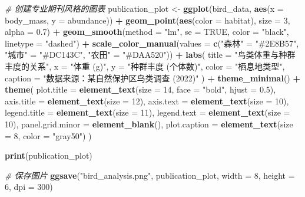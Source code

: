 \documentclass[
  twoside]{book}
\newenvironment{Shaded}{\begin{snugshade}}{\end{snugshade}}
\newcommand{\AttributeTok}[1]{\textcolor[rgb]{0.13,0.29,0.53}{#1}}
\newcommand{\CommentTok}[1]{\textcolor[rgb]{0.56,0.35,0.01}{\textit{#1}}}
\newcommand{\ConstantTok}[1]{\textcolor[rgb]{0.56,0.35,0.01}{#1}}
\newcommand{\DecValTok}[1]{\textcolor[rgb]{0.00,0.00,0.81}{#1}}
\newcommand{\FloatTok}[1]{\textcolor[rgb]{0.00,0.00,0.81}{#1}}
\newcommand{\FunctionTok}[1]{\textcolor[rgb]{0.13,0.29,0.53}{\textbf{#1}}}
\newcommand{\NormalTok}[1]{#1}
\newcommand{\OtherTok}[1]{\textcolor[rgb]{0.56,0.35,0.01}{#1}}
\newcommand{\SpecialCharTok}[1]{\textcolor[rgb]{0.81,0.36,0.00}{\textbf{#1}}}
\newcommand{\StringTok}[1]{\textcolor[rgb]{0.31,0.60,0.02}{#1}}
\begin{document}
\begin{Shaded}
\begin{Highlighting}[]
\CommentTok{\# 创建专业期刊风格的图表}
\NormalTok{publication\_plot }\OtherTok{\textless{}{-}} \FunctionTok{ggplot}\NormalTok{(bird\_data, }\FunctionTok{aes}\NormalTok{(}\AttributeTok{x =}\NormalTok{ body\_mass, }\AttributeTok{y =}\NormalTok{ abundance)) }\SpecialCharTok{+}
  \FunctionTok{geom\_point}\NormalTok{(}\FunctionTok{aes}\NormalTok{(}\AttributeTok{color =}\NormalTok{ habitat), }\AttributeTok{size =} \DecValTok{3}\NormalTok{, }\AttributeTok{alpha =} \FloatTok{0.7}\NormalTok{) }\SpecialCharTok{+}
  \FunctionTok{geom\_smooth}\NormalTok{(}\AttributeTok{method =} \StringTok{"lm"}\NormalTok{, }\AttributeTok{se =} \ConstantTok{TRUE}\NormalTok{, }\AttributeTok{color =} \StringTok{"black"}\NormalTok{, }\AttributeTok{linetype =} \StringTok{"dashed"}\NormalTok{) }\SpecialCharTok{+}
  \FunctionTok{scale\_color\_manual}\NormalTok{(}\AttributeTok{values =} \FunctionTok{c}\NormalTok{(}\StringTok{"森林"} \OtherTok{=} \StringTok{"\#2E8B57"}\NormalTok{, }\StringTok{"城市"} \OtherTok{=} \StringTok{"\#DC143C"}\NormalTok{, }\StringTok{"农田"} \OtherTok{=} \StringTok{"\#DAA520"}\NormalTok{)) }\SpecialCharTok{+}
  \FunctionTok{labs}\NormalTok{(}
    \AttributeTok{title =} \StringTok{"鸟类体重与种群丰度的关系"}\NormalTok{,}
    \AttributeTok{x =} \StringTok{"体重 (g)"}\NormalTok{,}
    \AttributeTok{y =} \StringTok{"种群丰度 (个体数)"}\NormalTok{,}
    \AttributeTok{color =} \StringTok{"栖息地类型"}\NormalTok{,}
    \AttributeTok{caption =} \StringTok{"数据来源：某自然保护区鸟类调查 (2022)"}
\NormalTok{  ) }\SpecialCharTok{+}
  \FunctionTok{theme\_minimal}\NormalTok{() }\SpecialCharTok{+}
  \FunctionTok{theme}\NormalTok{(}
    \AttributeTok{plot.title =} \FunctionTok{element\_text}\NormalTok{(}\AttributeTok{size =} \DecValTok{14}\NormalTok{, }\AttributeTok{face =} \StringTok{"bold"}\NormalTok{, }\AttributeTok{hjust =} \FloatTok{0.5}\NormalTok{),}
    \AttributeTok{axis.title =} \FunctionTok{element\_text}\NormalTok{(}\AttributeTok{size =} \DecValTok{12}\NormalTok{),}
    \AttributeTok{axis.text =} \FunctionTok{element\_text}\NormalTok{(}\AttributeTok{size =} \DecValTok{10}\NormalTok{),}
    \AttributeTok{legend.title =} \FunctionTok{element\_text}\NormalTok{(}\AttributeTok{size =} \DecValTok{11}\NormalTok{),}
    \AttributeTok{legend.text =} \FunctionTok{element\_text}\NormalTok{(}\AttributeTok{size =} \DecValTok{10}\NormalTok{),}
    \AttributeTok{panel.grid.minor =} \FunctionTok{element\_blank}\NormalTok{(),}
    \AttributeTok{plot.caption =} \FunctionTok{element\_text}\NormalTok{(}\AttributeTok{size =} \DecValTok{8}\NormalTok{, }\AttributeTok{color =} \StringTok{"gray50"}\NormalTok{)}
\NormalTok{  )}

\FunctionTok{print}\NormalTok{(publication\_plot)}

\CommentTok{\# 保存图片}
\FunctionTok{ggsave}\NormalTok{(}\StringTok{"bird\_analysis.png"}\NormalTok{, publication\_plot, }
       \AttributeTok{width =} \DecValTok{8}\NormalTok{, }\AttributeTok{height =} \DecValTok{6}\NormalTok{, }\AttributeTok{dpi =} \DecValTok{300}\NormalTok{)}
\end{Highlighting}
\end{Shaded}
\end{document}
